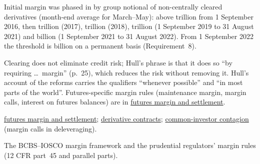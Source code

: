 \begin{qfmechanism}
Initial margin was phased in by group notional of non-centrally cleared derivatives (month-end average for March--May): above  trillion from 1 September 2016, then  trillion (2017),  trillion (2018),  trillion (1 September 2019 to 31 August 2021) and  billion (1 September 2021 to 31 August 2022). From 1 September 2022 the threshold is  billion on a permanent basis (Requirement~8).

 Clearing does not eliminate credit risk; Hull's phrase is that it does so ``by requiring \dots\ margin'' (p.~25), which reduces the risk without removing it. Hull's account of the reforms carries the qualifiers ``whenever possible'' and ``in most parts of the world''. Futures-specific margin rules (maintenance margin, margin calls, interest on futures balances) are in \hyperref[mech:futures-margin-settlement]{futures margin and settlement}.

 \hyperref[mech:futures-margin-settlement]{futures margin and settlement}; \hyperref[def:derivative-contracts]{derivative contracts}; \hyperref[def:common-investor-contagion]{common-investor contagion} (margin calls in deleveraging).

 The BCBS--IOSCO margin framework and the prudential regulators' margin rules (12 CFR part~45 and parallel parts).

\end{qfmechanism}

